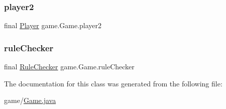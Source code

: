 \mbox{\label{classgame_1_1_game_a33d37e82a46b32c0679fa2dadf06e693}} 
\subsubsection{\texorpdfstring{player2}{player2}}
{\footnotesize\ttfamily final \mbox{\hyperlink{interfaceplayer_1_1_player}{Player}} game.\+Game.\+player2\hspace{0.3cm}{\ttfamily [private]}}

\mbox{\label{classgame_1_1_game_a804b73826eb085569b250318805ca4cc}} 
\subsubsection{\texorpdfstring{rule\+Checker}{ruleChecker}}
{\footnotesize\ttfamily final \mbox{\hyperlink{classrule_engine_1_1_rule_checker}{Rule\+Checker}} game.\+Game.\+rule\+Checker\hspace{0.3cm}{\ttfamily [private]}}



The documentation for this class was generated from the following file\+:\begin{DoxyCompactItemize}
\item 
game/\mbox{\hyperlink{_game_8java}{Game.\+java}}\end{DoxyCompactItemize}
